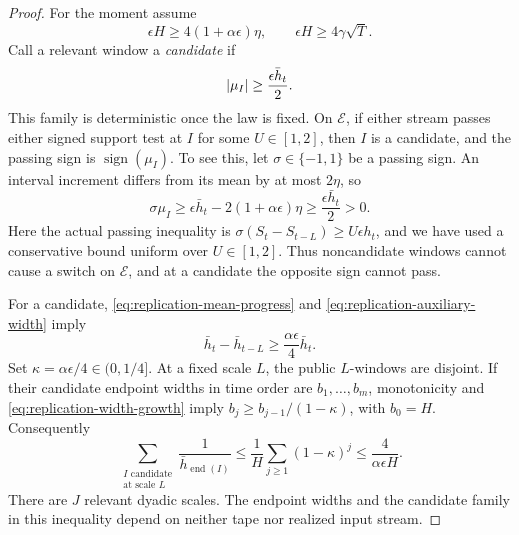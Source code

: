 \begin{proof}
For the moment assume
\begin{equation}
 \epsilon H\ge4(1+\alpha\epsilon)\eta,
 \qquad
 \epsilon H\ge4\gamma\sqrt T.
 \label{eq:replication-auxiliary-width}
\end{equation}
Call a relevant window a \emph{candidate} if
\begin{equation}
 \left|\mu_I\right|\ge\frac{\epsilon\bar h_t}{2}.
 \label{eq:replication-candidate}
\end{equation}
This family is deterministic once the law is fixed. On $\mathcal E$, if
either stream passes either signed support test at $I$ for some
$U\in[1,2]$, then $I$ is a candidate, and the passing sign is
$\operatorname{sign}(\mu_I)$. To see this, let $\sigma\in\{-1,1\}$
be a passing sign. An interval increment differs from its mean by at most
$2\eta$, so
\[
 \sigma\mu_I
 \ge\epsilon\bar h_t-2(1+\alpha\epsilon)\eta
 \ge\frac{\epsilon\bar h_t}{2}>0.
\]
Here the actual passing inequality is
$\sigma(S_t-S_{t-L})\ge U\epsilon h_t$, and we have used a conservative
bound uniform over $U\in[1,2]$. Thus noncandidate windows cannot cause
a switch on $\mathcal E$, and at a candidate the opposite sign cannot
pass.

For a candidate, \eqref{eq:replication-mean-progress} and
\eqref{eq:replication-auxiliary-width} imply
\begin{equation}
 \bar h_t-\bar h_{t-L}
 \ge\frac{\alpha\epsilon}{4}\bar h_t.
 \label{eq:replication-width-growth}
\end{equation}
Set $\kappa=\alpha\epsilon/4\in(0,1/4]$. At a fixed scale $L$, the
public $L$-windows are disjoint. If their candidate endpoint widths in
time order are $b_1,\ldots,b_m$, monotonicity and
\eqref{eq:replication-width-growth} imply
$b_j\ge b_{j-1}/(1-\kappa)$, with $b_0=H$. Consequently
\begin{equation}
 \sum_{\substack{I\text{ candidate}\\\text{at scale }L}}
       \frac1{\bar h_{\operatorname{end}(I)}}
 \le\frac1H\sum_{j\ge1}(1-\kappa)^j
 \le\frac{4}{\alpha\epsilon H}.
 \label{eq:replication-inverse-widths}
\end{equation}
There are $J$ relevant dyadic scales. The endpoint widths and the
candidate family in this inequality depend on neither tape nor realized
input stream.


\end{proof}
